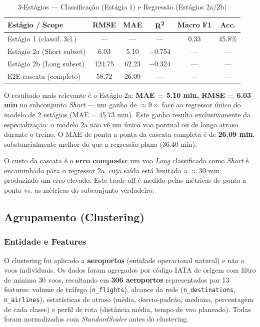 \documentclass[conference]{IEEEtran}
\begin{document}
\begin{table}[h]
\centering
\caption{3-Estágios — Classificação (Estágio 1) e Regressão (Estágios 2a/2b)}
\label{tab:three_stage}
\setlength{\tabcolsep}{3pt}
\begin{tabular}{lccccc}
\toprule
\textbf{Estágio / Scope} & \textbf{RMSE} & \textbf{MAE} & \textbf{R\textsuperscript{2}} & \textbf{Macro F1} & \textbf{Acc.} \\
\midrule
Estágio 1 (classif. 3cl.) & — & — & — & 0.33 & 45.8\% \\
Estágio 2a (Short subset) & 6.03 & 5.10 & $-0.754$ & — & — \\
Estágio 2b (Long subset)  & 124.75 & 62.23 & $-0.324$ & — & — \\
E2E cascata (completo)    & 58.72  & 26.09 & —  & — & — \\
\bottomrule
\end{tabular}
\end{table}

O resultado mais relevante é o Estágio 2a: \textbf{MAE = 5.10 min, RMSE = 6.03 min}
no subconjunto \textit{Short} — um ganho de $\approx 9\times$ face ao regressor único
do modelo de 2 estágios (MAE = 45.73 min). Este ganho resulta exclusivamente da
especialização: o modelo 2a não vê um único voo pontual ou de longo atraso durante o
treino. O MAE de ponta a ponta da cascata completa é de \textbf{26.09 min},
substancialmente melhor do que a regressão plana (36.40 min).

O custo da cascata é o \textbf{erro composto}: um voo \textit{Long} classificado
como \textit{Short} é encaminhado para o regressor 2a, cuja saída está limitada a
$\approx$30 min, produzindo um erro elevado. Este trade-off é medido pelas métricas
de ponta a ponta vs. as métricas do subconjunto verdadeiro.

\subsection{Agrupamento (Clustering)}

\subsubsection{Entidade e Features}

O clustering foi aplicado a \textbf{aeroportos} (entidade operacional natural) e não
a voos individuais. Os dados foram agregados por código IATA de origem com filtro de
mínimo 30 voos, resultando em \textbf{306 aeroportos} representados por 13 features:
volume de tráfego (\texttt{n\_flights}), alcance da rede (\texttt{n\_destinations},
\texttt{n\_airlines}), estatísticas de atraso (média, desvio-padrão, mediana,
percentagem de cada classe) e perfil de rota (distância média, tempo de voo
planeado). Todas foram normalizadas com \textit{StandardScaler} antes do clustering.
\end{document}
